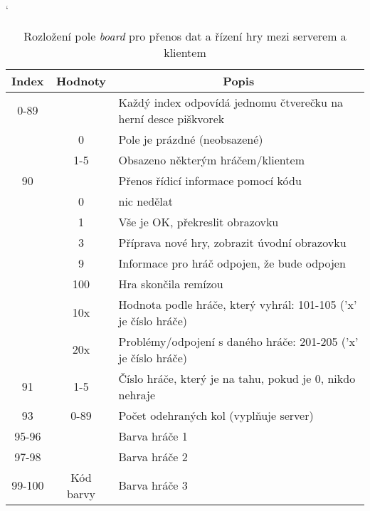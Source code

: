 \begin{table}[hbtp]
\catcode`
\caption{\label{tab:packet_server-client}Rozložení pole \textit{board} pro přenos dat a řízení hry mezi serverem a klientem}
\begin{tabular}{|c|c|l|}
\hline
Index   & Hodnoty     & \multicolumn{1}{c|}{Popis}                                      \\ \hline
0-89    &             & Každý index odpovídá jednomu čtverečku na herní desce piškvorek \\ \cline{2-3}
        & 0           & Pole je prázdné (neobsazené)                                    \\ \cline{2-3}
        & 1-5         & Obsazeno některým hráčem/klientem                               \\ \hline
90      &             & Přenos řídicí informace pomocí kódu                             \\ \cline{2-3}
        & 0           & nic nedělat                                                     \\ \cline{2-3}
        & 1           & Vše je OK, překreslit obrazovku                                 \\ \cline{2-3}
        & 3           & Příprava nové hry, zobrazit úvodní obrazovku                    \\ \cline{2-3}
        & 9           & Informace pro hráč odpojen, že bude odpojen                     \\ \cline{2-3}
        & 100         & Hra skončila remízou                                            \\ \cline{2-3}
        & 10x         & Hodnota podle hráče, který vyhrál: 101-105 ('x' je číslo hráče) \\ \cline{2-3}
        & 20x         & Problémy/odpojení s daného hráče: 201-205 ('x' je číslo hráče)  \\ \hline
91      & 1-5         & Číslo hráče, který je na tahu, pokud je 0, nikdo nehraje        \\ \hline
93      & 0-89        & Počet odehraných kol (vyplňuje server)                          \\ \hline
95-96   &             & Barva hráče 1                                                   \\ \cline{1-1} \cline{3-3}
97-98   &             & Barva hráče 2                                                   \\ \cline{1-1} \cline{3-3}
99-100  & Kód barvy   & Barva hráče 3                                                   \\ \cline{1-1} \cline{3-3}

\end{tabular}
\end{table}
